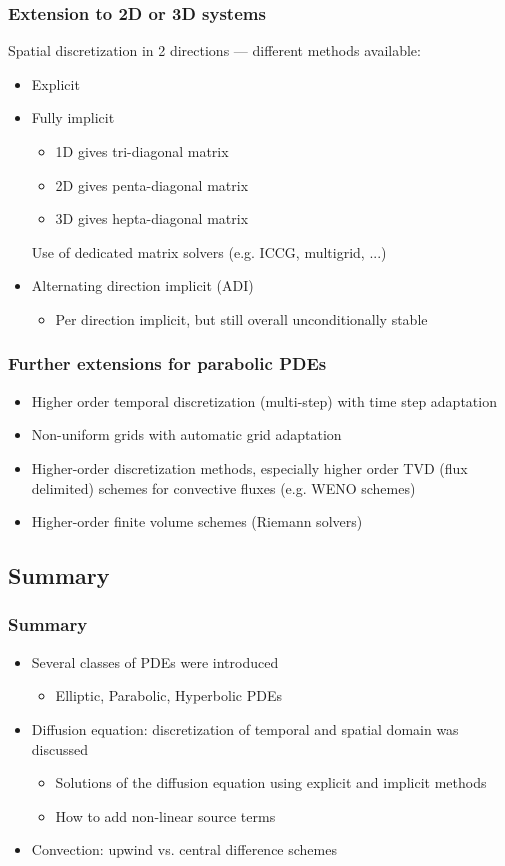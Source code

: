 \documentclass[11pt,table,final,fleqn,xcolor={usenames,dvipsnames,table}]{beamer}
\begin{document}
\begin{frame}
  \frametitle{Extension to 2D or 3D systems}
  Spatial discretization in 2 directions --- different methods available:
  \begin{itemize}
    \item Explicit
    \item Fully implicit
    \begin{itemize}
      \item 1D gives tri-diagonal matrix
      \item 2D gives penta-diagonal matrix
      \item 3D gives hepta-diagonal matrix
    \end{itemize}
    Use of dedicated matrix solvers (e.g. ICCG, multigrid, ...)
    \item Alternating direction implicit (ADI)
    \begin{itemize}
      \item Per direction implicit, but still overall unconditionally stable
    \end{itemize}
  \end{itemize}
\end{frame}

\begin{frame}
  \frametitle{Further extensions for parabolic PDEs}
  \begin{itemize}
    \item Higher order temporal discretization (multi-step) with time step adaptation
    \item Non-uniform grids with automatic grid adaptation
    \item Higher-order discretization methods, especially higher order TVD (flux delimited) schemes for convective fluxes (e.g. WENO schemes)
    \item Higher-order finite volume schemes (Riemann solvers)  
  \end{itemize}
\end{frame}

\subsection{Summary}
\begin{frame}
  \frametitle{Summary}
  \begin{itemize}
    \item Several classes of PDEs were introduced
    \begin{itemize}
      \item Elliptic, Parabolic, Hyperbolic PDEs
    \end{itemize}
    \item Diffusion equation: discretization of temporal and spatial domain was discussed
    \begin{itemize}
      \item Solutions of the diffusion equation using explicit and implicit methods
      \item How to add non-linear source terms
    \end{itemize}
    \item Convection: upwind vs. central difference schemes
  \end{itemize}
\end{frame}
\end{document}
